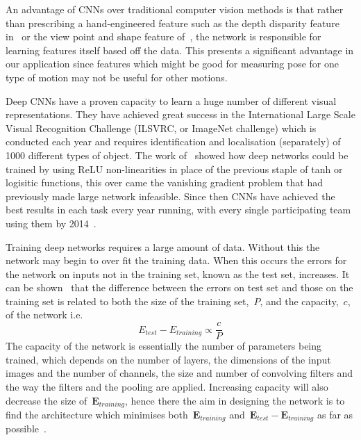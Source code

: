 \documentclass[11pt]{article} %
\begin{document}
An advantage of CNNs over traditional computer vision methods is that rather than prescribing a hand-engineered feature such as the depth disparity feature in~\cite{Shotton2011} or the view point and shape feature of~\cite{Chan2014}, the network is responsible for learning features itself based off the data. This presents a significant advantage in our application since features which might be good for measuring pose for one type of motion may not be useful for other motions. %

Deep CNNs have a proven capacity to learn a huge number of different visual representations. They have achieved great success in the International Large Scale Visual Recognition Challenge (ILSVRC, or ImageNet challenge) which is conducted each year and requires identification and localisation (separately) of 1000 different types of object. The work of~\cite{Krizhevsky2012} showed how deep networks could be trained by using ReLU non-linearities in place of the previous staple of tanh or logisitic functions, this over came the vanishing gradient problem that had previously made large network infeasible. Since then CNNs have achieved the best results in each task every year running, with every single participating team using them by 2014~\cite{Russakovsky}.

Training deep networks requires a large amount of data. Without this the network may begin to over fit the training data. When this occurs the errors for the network on inputs not in the training set, known as the test set, increases. It can be shown~\cite{Seung1992,Vapnik1994} that the difference between the errors on test set and those on the training set is related to both the size of the training set,~$P$, and the capacity,~$c$,  of the network i.e. 
\begin{equation}
E_{test}-E_{training} \propto \frac{c}{P}
\label{eq:errorCap}
\end{equation}
The capacity of the network is essentially the number of parameters being trained, which depends on the number of layers, the dimensions of the input images and the number of channels, the size and number of convolving filters and the way the filters and the pooling are applied. Increasing capacity will also decrease the size of~$\boldsymbol{E}_{training}$, hence there the aim in designing the network is to find the architecture which minimises both~$\boldsymbol{E}_{training}$ and~$\boldsymbol{E}_{test}-\boldsymbol{E}_{training}$ as far as possible~\cite{LeCun1998}.
\end{document}
